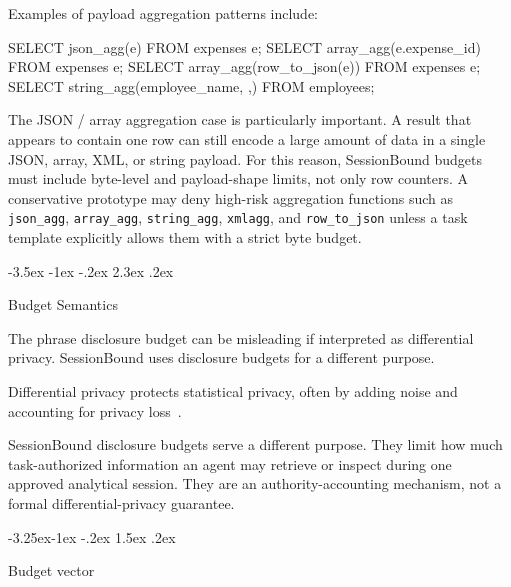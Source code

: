 \documentclass[10pt,twocolumn]{article}
\makeatletter
\newenvironment{Shaded}{}{}
\newcommand{\KeywordTok}[1]{\textcolor[rgb]{0.00,0.44,0.13}{#1}}
\newcommand{\NormalTok}[1]{#1}
\newcommand{\StringTok}[1]{\textcolor[rgb]{0.25,0.44,0.63}{#1}}
\newcounter{algorithm}
\renewcommand\section{\@startsection{section}{1}{\z@}%
  {-3.5ex \@plus -1ex \@minus -.2ex}%
  {2.3ex \@plus .2ex}%
  {\normalfont\Large\bfseries\raggedright}}
\renewcommand\subsection{\@startsection{subsection}{2}{\z@}%
  {-3.25ex\@plus -1ex \@minus -.2ex}%
  {1.5ex \@plus .2ex}%
  {\normalfont\large\bfseries\raggedright}}
\makeatother
\begin{document}
Examples of payload aggregation patterns include:

\begin{Shaded}
\begin{Highlighting}[]
\KeywordTok{SELECT}\NormalTok{ json\_agg(e) }\KeywordTok{FROM}\NormalTok{ expenses e;}
\KeywordTok{SELECT}\NormalTok{ array\_agg(e.expense\_id) }\KeywordTok{FROM}\NormalTok{ expenses e;}
\KeywordTok{SELECT}\NormalTok{ array\_agg(row\_to\_json(e)) }\KeywordTok{FROM}\NormalTok{ expenses e;}
\KeywordTok{SELECT}\NormalTok{ string\_agg(employee\_name, }\StringTok{\textquotesingle{},\textquotesingle{}}\NormalTok{) }\KeywordTok{FROM}\NormalTok{ employees;}
\end{Highlighting}
\end{Shaded}

The JSON / array aggregation case is particularly important. A result
that appears to contain one row can still encode a large amount of data
in a single JSON, array, XML, or string payload. For this reason,
SessionBound budgets must include byte-level and payload-shape limits,
not only row counters. A conservative prototype may deny high-risk
aggregation functions such as \texttt{json\_agg}, \texttt{array\_agg},
\texttt{string\_agg}, \texttt{xmlagg}, and \texttt{row\_to\_json} unless
a task template explicitly allows them with a strict byte budget.


\hypertarget{budget-semantics}{%
\section{Budget Semantics}\label{budget-semantics}}

The phrase disclosure budget can be misleading if interpreted
as differential privacy. SessionBound uses disclosure budgets for a
different purpose.

Differential privacy protects statistical privacy, often by adding noise
and accounting for privacy loss~\cite{dwork2014algorithmic}.

SessionBound disclosure budgets serve a different purpose. They limit
how much task-authorized information an agent may retrieve or inspect
during one approved analytical session. They are an authority-accounting
mechanism, not a formal differential-privacy guarantee.

\hypertarget{budget-vector}{%
\subsection{Budget vector}\label{budget-vector}}
\end{document}

